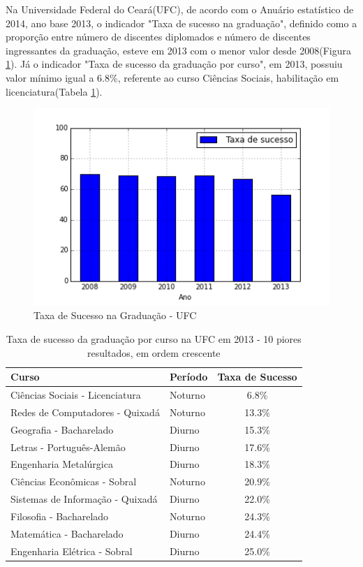 Na Universidade Federal do Ceará(UFC), de acordo com o Anuário estatístico de 2014, ano base 2013, o indicador "Taxa de sucesso na graduação", definido como a proporção entre número de discentes diplomados e número de discentes ingressantes da graduação, esteve em 2013 com o menor valor desde 2008(Figura \ref{img:taxa-de-sucesso-ufc}). Já o indicador "Taxa de sucesso da graduação por curso", em 2013, possuiu valor mínimo igual a 6.8\%, referente ao curso Ciências Sociais, habilitação em licenciatura(Tabela \ref{table:ts_2013}).

\begin{figure}[H]
	\includegraphics[scale=0.8]{img/taxa-de-sucesso-ufc.png}
	\caption{Taxa de Sucesso na Graduação - UFC}
	\label{img:taxa-de-sucesso-ufc}
\end{figure}

\begin{table}[H]
\begin{tabular}{llc}
\toprule
                            Curso &  Período & Taxa de Sucesso \\
\midrule
  Ciências Sociais - Licenciatura &  Noturno &            6.8\% \\
  Redes de Computadores - Quixadá &  Noturno &           13.3\% \\
          Geografia - Bacharelado &   Diurno &           15.3\% \\
        Letras - Português-Alemão &   Diurno &           17.6\% \\
           Engenharia Metalúrgica &   Diurno &           18.3\% \\
     Ciências Econômicas - Sobral &  Noturno &           20.9\% \\
 Sistemas de Informação - Quixadá &   Diurno &           22.0\% \\
          Filosofia - Bacharelado &  Noturno &           24.3\% \\
         Matemática - Bacharelado &   Diurno &           24.4\% \\
     Engenharia Elétrica - Sobral &   Diurno &           25.0\% \\
\bottomrule
\end{tabular}
\caption{Taxa de sucesso da graduação por curso na UFC em 2013 - 10 piores resultados, em ordem crescente}
\label{table:ts_2013}
\end{table}

